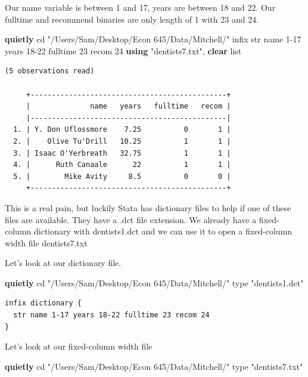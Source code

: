 \documentclass[
]{book}
\newenvironment{Shaded}{\begin{snugshade}}{\end{snugshade}}
\newcommand{\BaseNTok}[1]{\textcolor[rgb]{0.00,0.00,0.81}{#1}}
\newcommand{\DecValTok}[1]{\textcolor[rgb]{0.00,0.00,0.81}{#1}}
\newcommand{\KeywordTok}[1]{\textcolor[rgb]{0.13,0.29,0.53}{\textbf{#1}}}
\newcommand{\NormalTok}[1]{#1}
\newcommand{\OtherTok}[1]{\textcolor[rgb]{0.56,0.35,0.01}{#1}}
\newcommand{\StringTok}[1]{\textcolor[rgb]{0.31,0.60,0.02}{#1}}
\begin{document}
Our name variable is between 1 and 17, years are between 18 and 22. Our fulltime and recommend binaries are only length of 1 with 23 and 24.

\begin{Shaded}
\begin{Highlighting}[]
\KeywordTok{quietly}\NormalTok{ cd }\StringTok{"/Users/Sam/Desktop/Econ 645/Data/Mitchell/"}
\NormalTok{infix str }\BaseNTok{name}\NormalTok{ 1{-}17 years 18{-}22 fulltime 23 recom 24 }\KeywordTok{using} \StringTok{"dentists7.txt"}\NormalTok{, }\KeywordTok{clear}
\OtherTok{list}
\end{Highlighting}
\end{Shaded}

\begin{verbatim}
(5 observations read)

     +----------------------------------------------+
     |              name   years   fulltime   recom |
     |----------------------------------------------|
  1. | Y. Don Uflossmore    7.25          0       1 |
  2. |    Olive Tu'Drill   10.25          1       1 |
  3. | Isaac O'Yerbreath   32.75          1       1 |
  4. |      Ruth Canaale      22          1       1 |
  5. |        Mike Avity     8.5          0       0 |
     +----------------------------------------------+
\end{verbatim}

This is a real pain, but luckily Stata has dictionary files to help if one of these files are available. They have a .dct file extension. We already have a fixed-column dictionary with dentists1.dct and we can use it to open a fixed-column width file dentists7.txt

Let's look at our dictionary file.

\begin{Shaded}
\begin{Highlighting}[]
\KeywordTok{quietly}\NormalTok{ cd }\StringTok{"/Users/Sam/Desktop/Econ 645/Data/Mitchell/"}
\DecValTok{type} \StringTok{"dentists1.dct"}
\end{Highlighting}
\end{Shaded}

\begin{verbatim}
infix dictionary {
  str name 1-17 years 18-22 fulltime 23 recom 24
}
\end{verbatim}

Let's look at our fixed-column width file

\begin{Shaded}
\begin{Highlighting}[]
\KeywordTok{quietly}\NormalTok{ cd }\StringTok{"/Users/Sam/Desktop/Econ 645/Data/Mitchell/"}
\DecValTok{type} \StringTok{"dentists7.txt"}
\end{Highlighting}
\end{Shaded}
\end{document}
